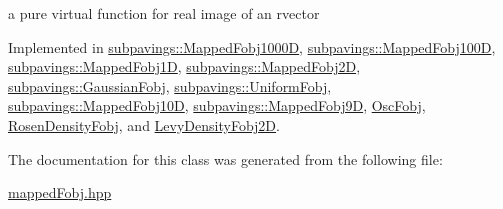 a pure virtual function for real image of an rvector 



\-Implemented in \hyperlink{classsubpavings_1_1MappedFobj1000D_aa99416ed43da9c31039f8f9d3b390d1e}{subpavings\-::\-Mapped\-Fobj1000\-D}, \hyperlink{classsubpavings_1_1MappedFobj100D_a85c7b43d20d5793676de4b1ff5f242d6}{subpavings\-::\-Mapped\-Fobj100\-D}, \hyperlink{classsubpavings_1_1MappedFobj1D_a9930e60eab4e038d6fd7e43101112c65}{subpavings\-::\-Mapped\-Fobj1\-D}, \hyperlink{classsubpavings_1_1MappedFobj2D_a9a36235f9dc9fa415b96aaf59e2959ad}{subpavings\-::\-Mapped\-Fobj2\-D}, \hyperlink{classsubpavings_1_1GaussianFobj_af865ee5060e1c83d2f484b1b697bc85c}{subpavings\-::\-Gaussian\-Fobj}, \hyperlink{classsubpavings_1_1UniformFobj_a61875542e031ba76f2fe680ad690fc63}{subpavings\-::\-Uniform\-Fobj}, \hyperlink{classsubpavings_1_1MappedFobj10D_ae9424a4d1c8eac86f5b5525f16bed7f7}{subpavings\-::\-Mapped\-Fobj10\-D}, \hyperlink{classsubpavings_1_1MappedFobj9D_afb61ca5bd02d0c1722a8163ec10da8ec}{subpavings\-::\-Mapped\-Fobj9\-D}, \hyperlink{classOscFobj_abc13936e90daaa530f97eea20cb6b310}{\-Osc\-Fobj}, \hyperlink{classRosenDensityFobj_afbc72b00926e0b6c9ad073bbb4823aba}{\-Rosen\-Density\-Fobj}, and \hyperlink{classLevyDensityFobj2D_ae35555f858adb6678520d26573f8eb25}{\-Levy\-Density\-Fobj2\-D}.



\-The documentation for this class was generated from the following file\-:\begin{DoxyCompactItemize}
\item 
\hyperlink{mappedFobj_8hpp}{mapped\-Fobj.\-hpp}\end{DoxyCompactItemize}
